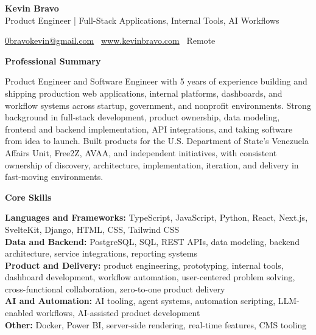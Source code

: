 \documentclass[11pt]{article}
\begin{document}
\begin{center}
    {\LARGE \textbf{Kevin Bravo}}\\
    Product Engineer | Full-Stack Applications, Internal Tools, AI Workflows \\
    \hrulefill
\end{center}

\begin{center}
    \href{mailto:0bravokevin@gmail.com}{0bravokevin@gmail.com}
    \textbullet\
    \href{http://www.kevinbravo.com}{www.kevinbravo.com}
    \textbullet\
Remote
\end{center}

\vspace{4pt}
\begin{center}
    \textbf{Professional Summary}
\end{center}
\vspace{-4pt}
Product Engineer and Software Engineer with 5 years of experience building and shipping production web applications, internal platforms, dashboards, and workflow systems across startup, government, and nonprofit environments. Strong background in full-stack development, product ownership, data modeling, frontend and backend implementation, API integrations, and taking software from idea to launch. Built products for the U.S. Department of State's Venezuela Affairs Unit, Free2Z, AVAA, and independent initiatives, with consistent ownership of discovery, architecture, implementation, iteration, and delivery in fast-moving environments.

\vspace{8pt}
\begin{center}
    \textbf{Core Skills}
\end{center}
\vspace{-4pt}
\textbf{Languages and Frameworks:} TypeScript, JavaScript, Python, React, Next.js, SvelteKit, Django, HTML, CSS, Tailwind CSS \\
\textbf{Data and Backend:} PostgreSQL, SQL, REST APIs, data modeling, backend architecture, service integrations, reporting systems \\
\textbf{Product and Delivery:} product engineering, prototyping, internal tools, dashboard development, workflow automation, user-centered problem solving, cross-functional collaboration, zero-to-one product delivery \\
\textbf{AI and Automation:} AI tooling, agent systems, automation scripting, LLM-enabled workflows, AI-assisted product development \\
\textbf{Other:} Docker, Power BI, server-side rendering, real-time features, CMS tooling
\end{document}
